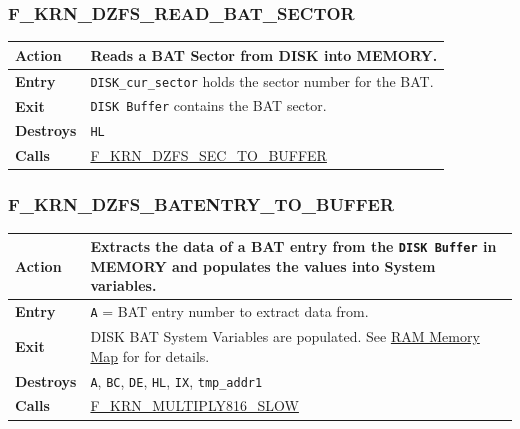 \documentclass[a4paper,11pt]{article}
\begin{document}
        \subsubsection{F\_KRN\_DZFS\_READ\_BAT\_SECTOR}
        \label{func:fkrndzfsreadbatsector}
        \begin{tabular}{l p{9cm}}
            \hline\textbf{Action}
            & Reads a BAT Sector from \textbf{DISK} into \textbf{MEMORY}.\\
            \hline\textbf{Entry} & \texttt{DISK\_cur\_sector} holds the sector 
            number for the BAT.\\
            \hline\textbf{Exit} & \texttt{DISK Buffer} contains the BAT sector.\\
            \hline\textbf{Destroys} & \texttt{HL} \\
            \hline\textbf{Calls}
            & \hyperref[func:fkrndzfssectobuffer]{F\_KRN\_DZFS\_SEC\_TO\_BUFFER}\\
            \hline
        \end{tabular}

        \subsubsection{F\_KRN\_DZFS\_BATENTRY\_TO\_BUFFER}
        \label{func:fkrndzfsbatentrytobuffer}
        \begin{tabular}{l p{9cm}}
            \hline\textbf{Action}
            & Extracts the data of a BAT entry from the \texttt{DISK Buffer}
            in \textbf{MEMORY} and populates the values into System variables.\\
            \hline\textbf{Entry} & \texttt{A} = BAT entry number to extract data
            from.\\
            \hline\textbf{Exit} & DISK BAT System Variables are populated. See
            \hyperref[sec:ram_memmap]{RAM Memory Map} for for details.\\
            \hline\textbf{Destroys} & \texttt{A}, \texttt{BC}, \texttt{DE}, 
            \texttt{HL}, \texttt{IX}, \texttt{tmp\_addr1} \\
            \hline\textbf{Calls}
            & \hyperref[func:fkrnmultiply816slow]{F\_KRN\_MULTIPLY816\_SLOW}\\
            \hline
        \end{tabular}
\end{document}
